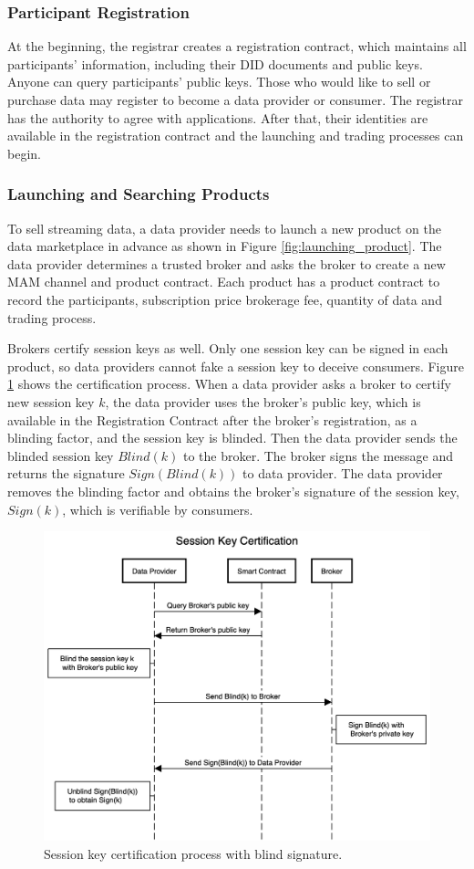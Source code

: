 \documentclass[journal,article,applsci,submit,moreauthors,pdftex]{Definitions/mdpi}
\begin{document}
\subsubsection{Participant Registration}
At the beginning, the registrar creates a registration contract, which maintains all participants' information, including their DID documents and public keys. Anyone can query participants' public keys. Those who would like to sell or purchase data may register to become a data provider or consumer. The registrar has the authority to agree with applications. After that, their identities are available in the registration contract and the launching and trading processes can begin.

\subsubsection{Launching and Searching Products}
To sell streaming data, a data provider needs to launch a new product on the data marketplace in advance as shown in Figure \ref{fig:launching_product}. The data provider determines a trusted broker and asks the broker to create a new MAM channel and product contract. Each product has a product contract to record the participants, subscription price brokerage fee, quantity of data and  trading process.

Brokers certify session keys as well. Only one session key can be signed in each product, so data providers cannot fake a session key to deceive consumers. Figure \ref{fig:key_certification} shows the certification process. When a data provider asks a broker to certify new session key $k$, the data provider uses the broker's public key, which is available in the Registration Contract after the broker's registration, as a blinding factor, and the session key is blinded. Then the data provider sends the blinded session key $Blind(k)$ to the broker. The broker signs the message and returns the signature $Sign(Blind(k))$ to data provider. The data provider removes the blinding factor and obtains the broker's signature of the session key, $Sign(k)$, which is verifiable by consumers.

\begin{figure}[H]
    \centering
    \includegraphics[width=4.4 in]{key_certification}
    \caption{Session key certification process with blind signature.}
    \label{fig:key_certification}
\end{figure}
\end{document}
